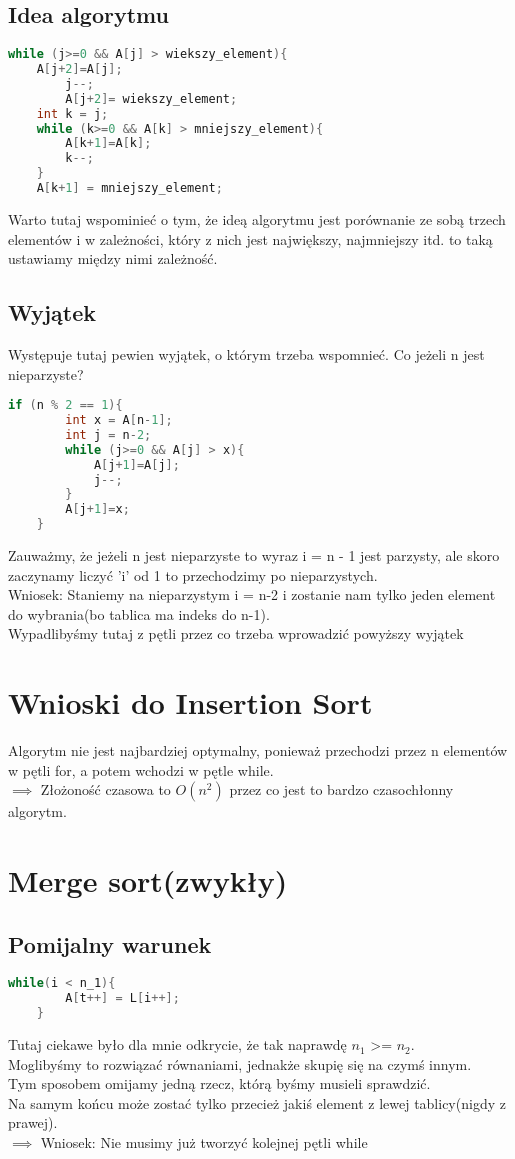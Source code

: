 \documentclass[12pt,a4paper]{article}
\begin{document}
\subsection{Idea algorytmu}
\begin{lstlisting}[language=C++]        
while (j>=0 && A[j] > wiekszy_element){
    A[j+2]=A[j];
        j--;
        A[j+2]= wiekszy_element;
    int k = j;
    while (k>=0 && A[k] > mniejszy_element){
        A[k+1]=A[k];
        k--;
    }
    A[k+1] = mniejszy_element;
\end{lstlisting}
Warto tutaj wspominieć o tym, że ideą algorytmu jest porównanie ze sobą trzech elementów i w zależności, który z nich jest największy, najmniejszy itd. to taką ustawiamy między nimi zależność.

\subsection{Wyjątek}
Występuje tutaj pewien wyjątek, o którym trzeba wspomnieć. Co jeżeli n jest nieparzyste?
\begin{lstlisting}[language=C++]        
    if (n % 2 == 1){
        int x = A[n-1];
        int j = n-2;
        while (j>=0 && A[j] > x){
            A[j+1]=A[j];
            j--;
        }
        A[j+1]=x;
    }
\end{lstlisting}
Zauważmy, że jeżeli n jest nieparzyste to wyraz i = n - 1 jest parzysty, ale skoro zaczynamy liczyć 'i' od 1 to przechodzimy po nieparzystych.\\
Wniosek: Staniemy na nieparzystym i = n-2 i zostanie nam tylko jeden element do wybrania(bo tablica ma indeks do n-1).\\
Wypadlibyśmy tutaj z pętli przez co trzeba wprowadzić powyższy wyjątek
\section{Wnioski do Insertion Sort}
Algorytm nie jest najbardziej optymalny, ponieważ przechodzi przez n elementów w pętli for, a potem wchodzi w pętle while.\\
$\implies$ Złożoność czasowa to $O(n^2)$ przez co jest to bardzo czasochłonny algorytm.
\clearpage
\section{Merge sort(zwykły)}
\subsection{Pomijalny warunek}
\begin{lstlisting}[language=C++]        
    while(i < n_1){
        A[t++] = L[i++];
    }
\end{lstlisting}
Tutaj ciekawe było dla mnie odkrycie, że tak naprawdę $n_1$ >= $n_2$.\\ Moglibyśmy to rozwiązać równaniami, jednakże skupię się na czymś innym.\\ Tym sposobem omijamy jedną rzecz, którą byśmy musieli sprawdzić. \\Na samym końcu może zostać tylko przecież jakiś element z lewej tablicy(nigdy z prawej).\\
$\implies$ Wniosek: Nie musimy już tworzyć kolejnej pętli while
\end{document}
